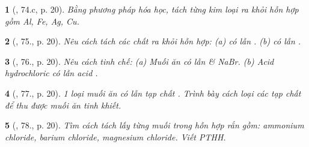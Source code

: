 \documentclass{article}
\newtheorem{baitoan}{}
\begin{document}
\begin{baitoan}[\cite{An_400_BT_Hoa_Hoc_9}, 74.c, p. 20]
	Bằng phương pháp hóa học, tách từng kim loại ra khỏi hỗn hợp gồm {\rm Al, Fe, Ag, Cu}.
\end{baitoan}

\begin{baitoan}[\cite{An_400_BT_Hoa_Hoc_9}, 75., p. 20]
	Nêu cách tách các chất ra khỏi hỗn hợp: (a) {\rm{} có lẫn }. (b) {\rm{} có lẫn }.
\end{baitoan}

\begin{baitoan}[\cite{An_400_BT_Hoa_Hoc_9}, 76., p. 20]
	Nêu cách tinh chế: (a) Muối ăn có lẫn {\rm{}} \& {\rm NaBr}. (b) Acid hydrochloric có lẫn acid {\rm{}}.
\end{baitoan}

\begin{baitoan}[\cite{An_400_BT_Hoa_Hoc_9}, 77., p. 20]
	1 loại muối ăn có lẫn tạp chất {\rm{}}. Trình bày cách loại các tạp chất để thu được muối ăn tinh khiết.
\end{baitoan}

\begin{baitoan}[\cite{An_400_BT_Hoa_Hoc_9}, 78., p. 20]
	Tìm cách tách lấy từng muối trong hỗn hợp rắn gồm: ammonium chloride, barium chloride, magnesium chloride. Viết {\rm PTHH}.
\end{baitoan}


\printbibliography[heading=bibintoc]
\end{document}
